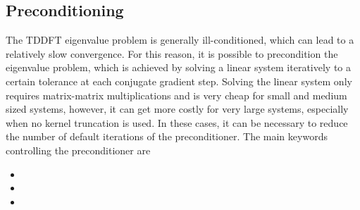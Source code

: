 \documentclass[letterpaper,10pt,english]{sphinxmanual}
\begin{document}
\subsection{Preconditioning}
\label{\detokenize{lr_tddft:preconditioning}}
The TDDFT eigenvalue problem is generally ill-conditioned, which can
lead to a relatively slow convergence. For this reason, it is possible
to precondition the eigenvalue problem, which is achieved by solving a
linear system iteratively to a certain tolerance at each conjugate
gradient step. Solving the linear system only requires matrix-matrix
multiplications and is very cheap for small and medium sized systems,
however, it can get more costly for very large systems, especially when
no kernel truncation is used. In these cases, it can be necessary to
reduce the number of default iterations of the preconditioner. The main
keywords controlling the preconditioner are
\begin{itemize}
\item {} 

\item {} 

\item {} 

\end{itemize}
\end{document}
